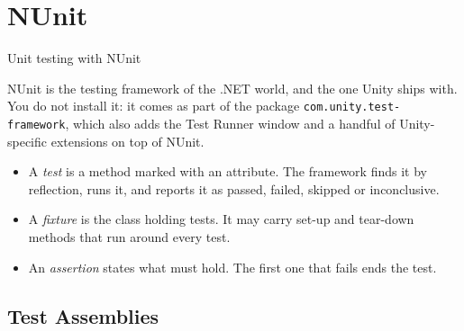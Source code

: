 
\section{NUnit}


\begin{frame}{Unit testing with NUnit}

  NUnit is the testing framework of the .NET world, and the one Unity ships
  with. You do not install it: it comes as part of the package
  \texttt{com.unity.test-framework}, which also adds the Test Runner window and
  a handful of Unity-specific extensions on top of NUnit.

  \begin{itemize}
    \item A \emph{test} is a method marked with an attribute. The framework
      finds it by reflection, runs it, and reports it as passed, failed,
      skipped or inconclusive.
    \item A \emph{fixture} is the class holding tests. It may carry set-up and
      tear-down methods that run around every test.
    \item An \emph{assertion} states what must hold. The first one that fails
      ends the test.
  \end{itemize}
  \vspace{2ex}

\end{frame}

\subsection{Test Assemblies}

